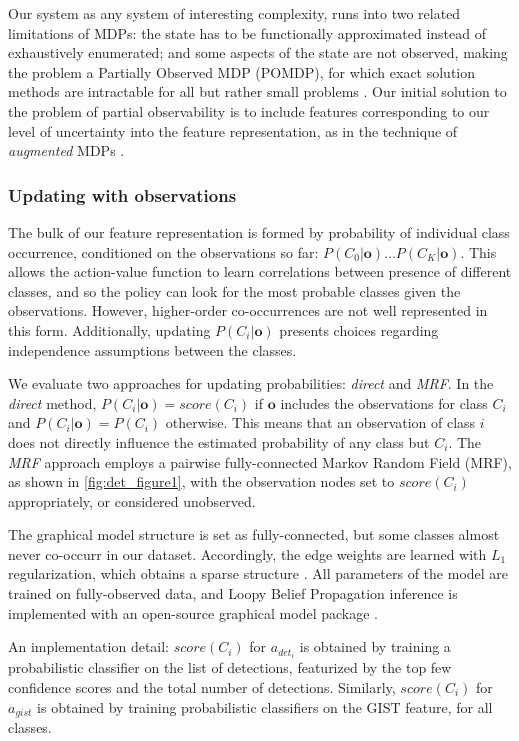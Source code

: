 Our system as any system of interesting complexity, runs into two related limitations of MDPs: the state has to be functionally approximated instead of exhaustively enumerated; and some aspects of the state are not observed, making the problem a Partially Observed MDP (POMDP), for which exact solution methods are intractable for all but rather small problems \parencite{Roy2002}.
Our initial solution to the problem of partial observability is to include features corresponding to our level of uncertainty into the feature representation, as in the technique of \emph{augmented} MDPs \parencite{Kwok2004}.

\subsubsection{Updating with observations}\label{sec:det_features_updating}

The bulk of our feature representation is formed by probability of individual class occurrence, conditioned on the observations so far: $P(C_0|\mathbf{o}) \ldots P(C_K|\mathbf{o})$.
This allows the action-value function to learn correlations between presence of different classes, and so the policy can look for the most probable classes given the observations.
However, higher-order co-occurrences are not well represented in this form.
Additionally, updating $P(C_i|\mathbf{o})$ presents choices regarding independence assumptions between the classes.

We evaluate two approaches for updating probabilities: \emph{direct} and \emph{MRF}.
In the \emph{direct} method, $P(C_i|\mathbf{o}) = score(C_i)$ if $\mathbf{o}$ includes the observations for class $C_i$ and $P(C_i|\mathbf{o}) = P(C_i)$ otherwise.
This means that an observation of class $i$ does not directly influence the estimated probability of any class but $C_i$.
The \emph{MRF} approach employs a pairwise fully-connected Markov Random Field (MRF), as shown in \autoref{fig:det_figure1}, with the observation nodes set to $score(C_i)$ appropriately, or considered unobserved.

The graphical model structure is set as fully-connected, but some classes almost never co-occurr in our dataset.
Accordingly, the edge weights are learned with $L_1$ regularization, which obtains a sparse structure \parencite{Lee2006}.
All parameters of the model are trained on fully-observed data, and Loopy Belief Propagation inference is implemented with an open-source graphical model package \parencite{Jaimovich2010}.

An implementation detail: $score(C_i)$ for $a_{{det}_i}$ is obtained by training a probabilistic classifier on the list of detections, featurized by the top few confidence scores and the total number of detections.
Similarly, $score(C_i)$ for $a_{gist}$ is obtained by training probabilistic classifiers on the GIST feature, for all classes.
